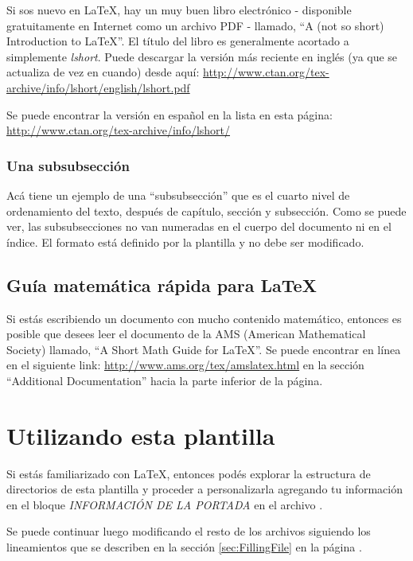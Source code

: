 Si sos nuevo en \LaTeX{}, hay un muy buen libro electrónico - disponible gratuitamente en Internet como un archivo PDF - llamado, \enquote{A (not so short) Introduction to \LaTeX{}}. El título del libro es generalmente acortado a simplemente \emph{lshort}. Puede descargar la versión más reciente en inglés (ya que se actualiza de vez en cuando) desde aquí:
\url{http://www.ctan.org/tex-archive/info/lshort/english/lshort.pdf}

Se puede encontrar la versión en español en la lista en esta página: \url{http://www.ctan.org/tex-archive/info/lshort/}

\subsubsection{Una subsubsección}

Acá tiene un ejemplo de una ``subsubsección'' que es el cuarto nivel de ordenamiento del texto, después de capítulo, sección y subsección.  Como se puede ver, las subsubsecciones no van numeradas en el cuerpo del documento ni en el índice.  El formato está definido por la plantilla y no debe ser modificado.

\subsection{Guía matemática rápida para \LaTeX{}}

Si estás escribiendo un documento con mucho contenido matemático, entonces es posible que desees leer el documento de la AMS (American Mathematical Society) llamado, \enquote{A Short Math Guide for \LaTeX{}}. Se puede encontrar en línea en el siguiente link: \url{http://www.ams.org/tex/amslatex.html} en la sección \enquote{Additional Documentation} hacia la parte inferior de la página.



\section{Utilizando esta plantilla}

Si estás familiarizado con \LaTeX{}, entonces podés explorar la estructura de directorios de esta plantilla y proceder a personalizarla agregando tu información en el bloque \emph{INFORMACIÓN DE LA PORTADA} en el archivo .  

Se puede continuar luego modificando el resto de los archivos siguiendo los lineamientos que se describen en la sección \ref{sec:FillingFile} en la página \pageref{sec:FillingFile}.

